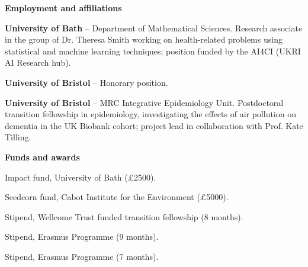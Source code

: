 \documentclass[11pt,usenames, dvipsnames]{article}
\begin{document}
{\large \bfseries \color{color_64493} Employment and affiliations}\newline
\vspace{1pt}

 {\bfseries University of Bath} -- Department of Mathematical Sciences.
\newline Research associate in the group of Dr. Theresa Smith working on health-related problems using statistical and machine learning techniques; position funded by the AI4CI (UKRI AI Research hub). 
\newline    

\vspace{7pt}

 {\bfseries University of Bristol} -- Honorary position. 
\newline    

\vspace{7pt}


 {\bfseries University of Bristol} -- MRC Integrative Epidemiology Unit.
\newline Postdoctoral transition fellowship in epidemiology, investigating the effects of air pollution on dementia in the UK Biobank cohort; project lead in collaboration with Prof. Kate Tilling.


\newpage

{\large \bfseries \color{color_64493} Funds and awards}\newline
\vspace{1pt}

 Impact fund, University of Bath (£2500).
\vspace{7pt}

 Seedcorn fund, Cabot Institute for the Environment (£5000).
\vspace{7pt}


 Stipend, Wellcome Trust funded transition fellowship (8 months).
\vspace{7pt}

 Stipend, Erasmus Programme (9 months).
\vspace{7pt}

 Stipend, Erasmus  Programme (7 months).

\vspace{1.2cm}
\end{document}
